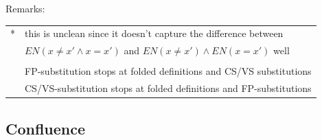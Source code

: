 \documentclass[a4paper]{article}
\begin{document}
Remarks:\\
\begin{tabular}{ll}
  * & this is unclean since it doesn't capture the difference between \\
     &  $EN (x\neq x' \land x=x')$ and $EN (x\neq x') \land EN (x=x')$ well\\
  \\
  & FP-substitution stops at folded definitions and CS/VS substitutions\\
  & CS/VS-substitution stops at folded definitions and FP-substitutions\\
\end{tabular}

\subsection{Confluence}
\label{sec:confluence}
\end{document}
